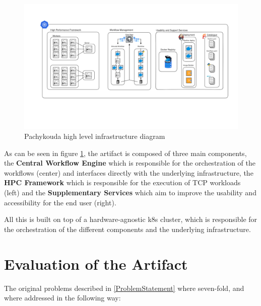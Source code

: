 \begin{figure}[htb]
    \centering
    \includegraphics[width=16cm]{graphics/pachykouda_three_aspects.png}
    \caption[Pachykouda high level diagram showing three main aspects]{Pachykouda high level infrastructure diagram}
    \label{abb:pachykouda_three_aspects}
\end{figure}


As can be seen in figure \ref{abb:pachykouda_three_aspects}, the artifact is composed of three main components, 
the \textbf{Central Workflow Engine} which is responsible for the orchestration of the workflows (center) and interfaces directly with the underlying infrastructure,
the \textbf{\ac{HPC} Framework} which is responsible for the execution of \ac{TCP} workloads (left)
and the \textbf{Supplementary Services} which aim to improve the usability and accessibility for the end user (right).

All this is built on top of a hardware-agnostic \ac{k8s} cluster, which is responsible for the orchestration of the different components and the underlying infrastructure.







\section{Evaluation of the Artifact}


The original problems described in \ref{ProblemStatement} where seven-fold, and where addressed in the following way:

